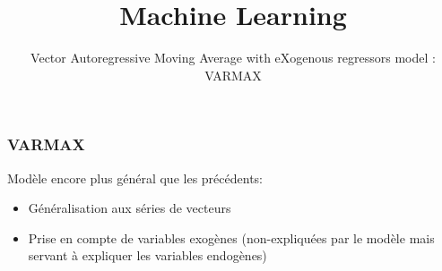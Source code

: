 \documentclass{formation}
\title{Machine Learning}
\subtitle{Vector Autoregressive Moving Average with eXogenous regressors model : VARMAX}
\begin{document}
\maketitle

\begin{frame}
  \frametitle{VARMAX}
  Modèle encore plus général que les précédents:
  \begin{itemize}
  \item Généralisation aux séries de vecteurs
  \item Prise en compte de variables exogènes (non-expliquées par le modèle mais servant à expliquer les variables endogènes)
  \end{itemize}
\end{frame}
\end{document}
